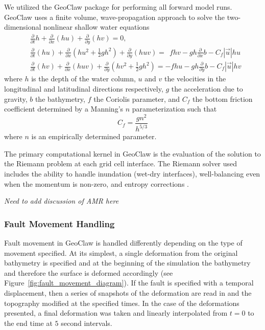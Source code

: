 \documentclass[preprint,review,12pt]{elsarticle}
\newcommand{\geoclaw}{{\sc GeoClaw}\xspace}
\newcommand{\pd}[2]{\ensuremath{\frac{\partial #1}{\partial #2}}} %
\begin{document}
We utilized the \geoclaw package for performing all forward model runs.  \geoclaw uses a finite volume, wave-propagation approach to solve the two-dimensional nonlinear shallow water equations
\begin{equation} \label{eq:swe}
    \begin{aligned}
    &\pd{}{t} h + \pd{}{x} (hu) + \pd{}{y} (hv) = 0, \\
    &\pd{}{t}(hu) + \pd{}{x} \left(hu^2 + \frac{1}{2} g h^2 \right ) + \pd{}{y} (huv) = ~~ fhv - gh \pd{}{x} b - C_f |\vec{u}| hu \\
    &\pd{}{t} (hv) + \pd{}{x} (huv) + \pd{}{y} \left (hv^2 + \frac{1}{2} gh^2 \right) = -fhu - gh \pd{}{y} b - C_f |\vec{u}| hv
    \end{aligned}
\end{equation}
where $h$ is the depth of the water column, $u$ and $v$ the velocities in the longitudinal and latitudinal directions respectively, $g$ the acceleration due to gravity, $b$ the bathymetry, $f$ the Coriolis parameter, and $C_f$ the bottom friction coefficient determined by a Manning's $n$ parameterization such that
\begin{equation}
    C_f = \frac{g n^2}{h^{5/3}}
\end{equation}
where $n$ is an empirically determined parameter.

The primary computational kernel in \geoclaw is the evaluation of the solution to the Riemann problem at each grid cell interface.  The Riemann solver used includes the ability to handle inundation (wet-dry interfaces), well-balancing even when the momentum is non-zero, and entropy corrections \cite{George:2008aa}.

\emph{Need to add discussion of AMR here}

\subsubsection{Fault Movement Handling} \label{ssub:fault_movement}

Fault movement in \geoclaw is handled differently depending on the type of movement specified.  At its simplest, a single deformation from the original bathymetry is specified and at the beginning of the simulation the bathymetry and therefore the surface is deformed accordingly (see Figure~\ref{fig:fault_movement_diagram}).  If the fault is specified with a temporal displacement, then a series of snapshots of the deformation are read in and the topography modified at the specified times.  In the case of the deformations presented, a final deformation was taken and linearly interpolated from $t=0$ to the end time at $5$ second intervals.
\end{document}
